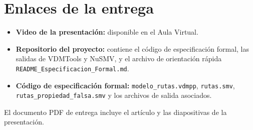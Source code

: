 \section{Enlaces de la entrega}
\label{app:enlaces}

\begin{itemize}
  \item \textbf{Video de la presentación:} disponible en el Aula Virtual.
  \item \textbf{Repositorio del proyecto:} contiene el código de especificación formal, las salidas de VDMTools y NuSMV, y el archivo de orientación rápida \texttt{README\_Especificacion\_Formal.md}.
  \item \textbf{Código de especificación formal:} \texttt{modelo\_rutas.vdmpp}, \texttt{rutas.smv}, \texttt{rutas\_propiedad\_falsa.smv} y los archivos de salida asociados.
\end{itemize}

El documento PDF de entrega incluye el artículo y las diapositivas de la presentación.
